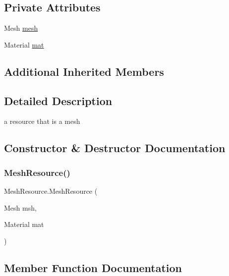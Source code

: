 \subsection*{Private Attributes}
\begin{DoxyCompactItemize}
\item 
Mesh \mbox{\hyperlink{class_mesh_resource_a4c0c407759bcc6540dc77547ad805108}{mesh}}
\item 
Material \mbox{\hyperlink{class_mesh_resource_adfdc1e465f534b5e74a33d6880460e35}{mat}}
\end{DoxyCompactItemize}
\subsection*{Additional Inherited Members}


\subsection{Detailed Description}
a resource that is a mesh 



\subsection{Constructor \& Destructor Documentation}
\mbox{\label{class_mesh_resource_a6ae6a4eb435fde7c0b67b65eda036a1a}} 
\subsubsection{\texorpdfstring{Mesh\+Resource()}{MeshResource()}}
{\footnotesize\ttfamily Mesh\+Resource.\+Mesh\+Resource (\begin{DoxyParamCaption}\item[{Mesh}]{msh,  }\item[{Material}]{mat }\end{DoxyParamCaption})}



\subsection{Member Function Documentation}
\mbox{\label{class_mesh_resource_af15a1d1060432e07a256bd3fa54d9b1c}} 
